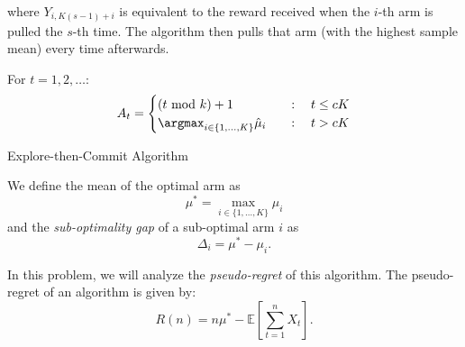\documentclass[12pt, addpoints]{exam}
\begin{document}
\begin{questions}
where $Y_{i, K(s - 1) + i}$ is equivalent to the reward received when the $i$-th arm is pulled the $s$-th time. The algorithm then pulls that arm (with the highest sample mean) every time afterwards.
\begin{algorithm}[H]
For $t=1, 2, \ldots: $
\[ A_t=\begin{cases} (t \ \text{mod} \ k)+1 \ \ \ &: \ \ \ t\le cK \\ \argmax_{i \in \{1,\ldots, K\}} \hat \mu_i \ \ \ &: \ \ \ t>cK \end{cases} \]
\caption{Explore-then-Commit Algorithm}
\label{alg:etc}
\end{algorithm} 


We define the mean of the optimal arm as
\[ \mu^\ast=\max_{i \in \{1, \ldots, K\}}\mu_i\]
and the \textit{sub-optimality gap} of a sub-optimal arm $i$ as
\[ \Delta_i=\mu^*-\mu_i. \]

In this problem, we will analyze the \textit{pseudo-regret} of this algorithm. The pseudo-regret of an algorithm is given by:
\[ R(n)=n \mu^\ast - \mathbb{E}\left [\sum_{t=1}^n X_{t}\right].\]

\end{questions}
\end{document}
